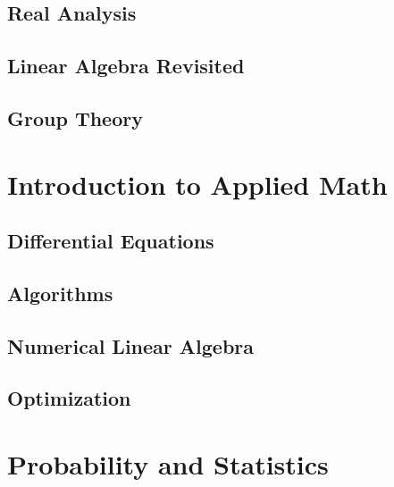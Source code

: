 \documentclass[oneside,openany]{book}
\theoremstyle{definition}
\begin{document}
\chapter{Real Analysis}


\chapter{Linear Algebra Revisited}


\chapter{Group Theory}



\part{Introduction to Applied Math}

\chapter{Differential Equations}


\chapter{Algorithms}


\chapter{Numerical Linear Algebra}


\chapter{Optimization}



\part{Probability and Statistics}
\end{document}
